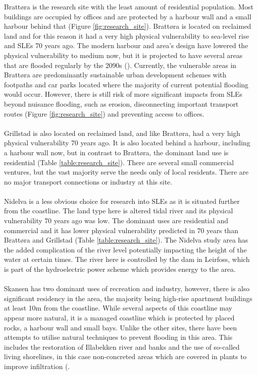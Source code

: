 Brattøra is the research site with the least amount of residential population. Most buildings are occupied by offices and are protected by a harbour wall and a small harbour behind that (Figure \ref{fig:research_site}). Brattøra is located on reclaimed land and for this reason it had a very high physical vulnerability to sea-level rise and SLEs 70 years ago. The modern harbour and area's design have lowered the physical vulnerability to medium now, but it is projected to have several areas that are flooded regularly by the 2090s (\cite{kartverket_se_2020}). Currently, the vulnerable areas in Brattøra are predominantly sustainable urban development schemes with footpaths and car parks located where the majority of current potential flooding would occur. However, there is still risk of more significant impacts from SLEs beyond nuisance flooding, such as erosion, disconnecting important transport routes (Figure \ref{fig:research_site}) and preventing access to offices.
\paragraph{}
Grillstad is also located on reclaimed land, and like Brattøra, had a very high physical vulnerability 70 years ago. It is also located behind a harbour, including a harbour wall now, but in contrast to  Brattøra, the dominant land use is residential (Table \ref{table:research_site}). There are several small commercial ventures, but the vast majority serve the needs only of local residents. There are no major transport connections or industry at this site. 
\paragraph{}
Nidelva is a less obvious choice for research into SLEs as it is situated further from the coastline. The land type here is altered tidal river and its physical vulnerability 70 years ago was low. The dominant uses are residential and commercial and it has lower physical vulnerability predicted in 70 years than Brattøra and Grillstad (Table \ref{table:research_site}). The Nidelva study area has the added complication of the river level potentially impacting the height of the water at certain times. The river here is controlled by the dam in Leirfoss, which is part of the hydroelectric power scheme which provides energy to the area.
\paragraph{}
Skansen has two dominant uses of recreation and industry, however, there is also significant residency in the area, the majority being high-rise apartment buildings at least 10m from the coastline. While several aspects of this coastline may appear more natural, it is a managed coastline which is protected by placed rocks, a harbour wall and small bays. Unlike the other sites, there have been attempts to utilise natural techniques to prevent flooding in this area. This includes the restoration of Illabekken river and banks and the use of so-called living shorelines, in this case non-concreted areas which are covered in plants to improve infiltration (\cite{selliseth_ilabekken_2021}.

